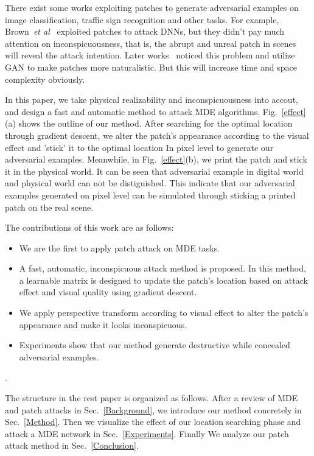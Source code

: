 \documentclass[10pt,twocolumn,letterpaper]{article}
\begin{document}
There exist some works exploiting patches to generate 
adversarial examples on image classification,
traffic sign recognition and other tasks.
For example, Brown~\textit{et al}~\cite{Brown_2017_arxiv}
exploited patches to attack 
DNNs, but they didn’t 
pay much attention on inconspicuousness, that is, 
the abrupt and unreal patch in scenes will reveal 
the attack intention.
Later works~\cite{Hu_2021_ICCV,Kong_2020_CVPR,Liu_2019_AAAI}
noticed this problem and utilize 
GAN to make patches
more naturalistic. 
But this will increase time and space complexity obviously.

In this paper, we take physical realizability and 
inconspicuousness into accout, and design a fast and automatic
method to attack MDE algorithms.
Fig.~\ref{effect}(a) shows the outline of our method.
After searching for the optimal location through gradient 
descent, we alter the patch's appearance according to the 
visual effect and 'stick' it to the optimal location In
pixel level to generate our adversarial examples.
Meanwhile, in Fig.~\ref{effect}(b), we print the patch
and stick it in the physical world.
It can be seen that adversarial example in digital world 
and physical world can not be distiguished.
This indicate that our adversarial examples generated
on pixel level can be simulated through sticking a printed patch 
on the real scene.

The contributions of this work are as follows:
\begin{itemize}
	\item We are the first to apply patch attack on MDE
	tasks.
	\item  A fast, automatic, inconspicuous attack 
	method is proposed. In this method, a learnable 
	matrix is designed to update the patch's location
	based on attack effect and visual quality using gradient 
	descent. 
	\item We apply perspective transform according to visual 
	effect to alter the patch's appearance and make 
	it looks inconspicuous. 
	\item Experiments show that our method generate destructive 
	while concealed adversarial examples.
\end{itemize}.

The structure in the rest paper is organized as
follows. After a review of MDE and patch attacks in
Sec.~\ref{Background}, we introduce our method 
concretely in Sec.~\ref{Method}. Then we visualize 
the effect of our location searching phase and attack a
MDE network in Sec.~\ref{Experiments}. Finally We
analyze our patch attack method in Sec.~\ref{Conclusion}.
\end{document}
